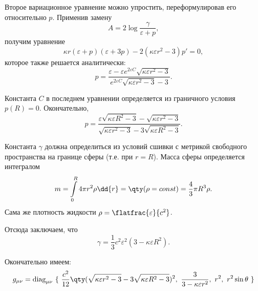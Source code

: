 \documentclass[\docroot/reports/draft/report.tex]{subfiles}
\begin{document}
    Второе вариационное уравнение можно упростить, переформулировав его относительно $p$. Применив замену
    \begin{equation*}
        A = 2 \log{\frac{\gamma}{\varepsilon + p}} ,
    \end{equation*}
    получим уравнение
    \begin{equation*}
        \kappa r (\varepsilon + p) (\varepsilon + 3 p) - 2 (\kappa \varepsilon r^2 - 3) p' = 0 ,
    \end{equation*}
    которое также решается аналитически:
    \begin{equation*}
        p = \frac{\varepsilon - \varepsilon e^{2 \varepsilon C} \sqrt{\kappa \varepsilon r^2 - 3}}{e^{2 \varepsilon C} \sqrt{\kappa \varepsilon r^2 - 3} - 3} .
    \end{equation*}

    Константа $C$ в последнем уравнении определяется из граничного условия $p(R) = 0$. Окончательно,
    \begin{equation}
        p = \frac{\varepsilon \sqrt{\kappa \varepsilon R^2 - 3} - \sqrt{\kappa \varepsilon r^2 - 3}}{
            \sqrt{\kappa \varepsilon r^2 - 3} - 3 \sqrt{\kappa \varepsilon R^2 - 3}} .
    \end{equation}

    Константа $\gamma$ должна определиться из условий сшивки с метрикой свободного пространства на границе сферы (т.е. при $r = R$). Масса сферы определяется интегралом
    \begin{equation*}
        m = \int\limits_0^R 4 \pi r^2 \rho \dd{r} = \qty( \rho = const ) = \frac{4}{3} \pi R^3 \rho .
    \end{equation*}
    Сама же плотность жидкости $\rho = \flatfrac{\varepsilon}{c^2}$.

    Отсюда заключаем, что
    \begin{equation}
        \gamma = \frac{1}{3} c^2 \varepsilon^2 (3 - \kappa \varepsilon R^2) .
    \end{equation}

    Окончательно имеем:
    \begin{equation}
        g_{\mu\nu} = \text{diag}_{\mu\nu}\ \{\
            \frac{c^2}{12} \qty(\sqrt{\kappa \varepsilon r^2 - 3} - 3 \sqrt{\kappa \varepsilon R^2 - 3})^2,\
            \frac{3}{3 - \kappa \varepsilon r^2},\
            r^2,\
            r^2 \sin\theta
        \ \}
    \end{equation}
\end{document}
